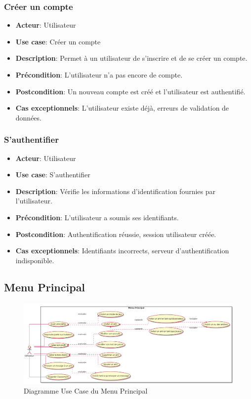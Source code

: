 \documentclass{article}
\begin{document}
\subsubsection*{Créer un compte}
\begin{itemize}
    \item \textbf{Acteur}: Utilisateur
    \item \textbf{Use case}: Créer un compte
    \item \textbf{Description}: Permet à un utilisateur de s’inscrire et de se créer un compte.
    \item \textbf{Précondition}: L’utilisateur n’a pas encore de compte.
    \item \textbf{Postcondition}: Un nouveau compte est créé et l'utilisateur est authentifié.
    \item \textbf{Cas exceptionnels}: L'utilisateur existe déjà, erreurs de validation de données.
\end{itemize}

\subsubsection*{S'authentifier}
\begin{itemize}
    \item \textbf{Acteur}: Utilisateur
    \item \textbf{Use case}: S'authentifier
    \item \textbf{Description}: Vérifie les informations d'identification fournies par l'utilisateur.
    \item \textbf{Précondition}: L'utilisateur a soumis ses identifiants.
    \item \textbf{Postcondition}: Authentification réussie, session utilisateur créée.
    \item \textbf{Cas exceptionnels}: Identifiants incorrects, serveur d’authentification indisponible.
\end{itemize}

\newpage

\subsection{Menu Principal}

\begin{figure}[!h]
    \centering
    \includegraphics[width=1\textwidth]{../../res/uml/usecase/MenuPrincipalUseCase.png}
    \caption{Diagramme Use Case du Menu Principal}
    \label{fig:main-menu}
\end{figure}
\end{document}
